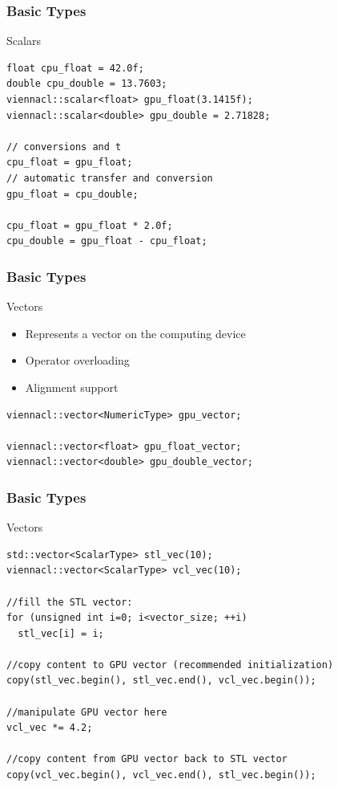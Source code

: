 \begin{frame}[fragile]
\frametitle{Basic Types}
\begin{block}{Scalars}
  \begin{lstlisting}
float cpu_float = 42.0f;
double cpu_double = 13.7603;
viennacl::scalar<float> gpu_float(3.1415f);
viennacl::scalar<double> gpu_double = 2.71828;

// conversions and t
cpu_float = gpu_float;
// automatic transfer and conversion
gpu_float = cpu_double;

cpu_float = gpu_float * 2.0f;
cpu_double = gpu_float - cpu_float;
  \end{lstlisting}
\end{block}
\end{frame}



\begin{frame}[fragile]
\frametitle{Basic Types}

\begin{block}{Vectors}  
  \begin{itemize}
   \item Represents a vector on the computing device
   \item Operator overloading
   \item Alignment support
  \end{itemize}
  
  \begin{lstlisting}
viennacl::vector<NumericType> gpu_vector;

viennacl::vector<float> gpu_float_vector;
viennacl::vector<double> gpu_double_vector;
  \end{lstlisting}
\end{block}

\end{frame}



\begin{frame}[fragile]
\frametitle{Basic Types}

\begin{block}{Vectors}
  \begin{lstlisting}
std::vector<ScalarType> stl_vec(10);
viennacl::vector<ScalarType> vcl_vec(10);

//fill the STL vector:
for (unsigned int i=0; i<vector_size; ++i)
  stl_vec[i] = i;

//copy content to GPU vector (recommended initialization)
copy(stl_vec.begin(), stl_vec.end(), vcl_vec.begin());

//manipulate GPU vector here
vcl_vec *= 4.2;

//copy content from GPU vector back to STL vector
copy(vcl_vec.begin(), vcl_vec.end(), stl_vec.begin());
  \end{lstlisting}
\end{block}

\end{frame}



